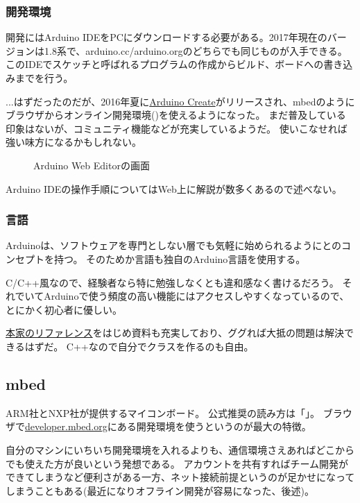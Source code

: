 \documentclass[letterpaper,10pt,dvipdfmx]{sphinxmanual}
\begin{document}
\subsubsection{開発環境}
\label{\detokenize{begginers/microcontroller:id6}}
開発にはArduino
IDEをPCにダウンロードする必要がある。2017年現在のバージョンは1.8系で、arduino.cc/arduino.orgのどちらでも同じものが入手できる。このIDEでスケッチと呼ばれるプログラムの作成からビルド、ボードへの書き込みまでを行う。

...はずだったのだが、2016年夏に\href{https://create.arduino.cc/}{Arduino
Create}がリリースされ、mbedのようにブラウザからオンライン開発環境()を使えるようになった。
まだ普及している印象はないが、コミュニティ機能などが充実しているようだ。
使いこなせれば強い味方になるかもしれない。
\begin{figure}[htbp]
\centering
\capstart

\noindent{}
\caption{Arduino Web Editorの画面}\label{\detokenize{begginers/microcontroller:id12}}\end{figure}

Arduino IDEの操作手順についてはWeb上に解説が数多くあるので述べない。


\subsubsection{言語}
\label{\detokenize{begginers/microcontroller:id7}}
Arduinoは、ソフトウェアを専門としない層でも気軽に始められるようにとのコンセプトを持つ。
そのためか言語も独自のArduino言語を使用する。

C/C++風なので、経験者なら特に勉強しなくとも違和感なく書けるだろう。
それでいてArduinoで使う頻度の高い機能にはアクセスしやすくなっているので、とにかく初心者に優しい。

\href{https://www.arduino.cc/en/Reference/}{本家のリファレンス}をはじめ資料も充実しており、ググれば大抵の問題は解決できるはずだ。
C++なので自分でクラスを作るのも自由。


\subsection{mbed}
\label{\detokenize{begginers/microcontroller:mbed}}
ARM社とNXP社が提供するマイコンボード。
公式推奨の読み方は「」。
ブラウザで\href{https://developer.mbed.org/}{developer.mbed.org}にある開発環境を使うというのが最大の特徴。

自分のマシンにいちいち開発環境を入れるよりも、通信環境さえあればどこからでも使えた方が良いという発想である。
アカウントを共有すればチーム開発ができてしまうなど便利さがある一方、ネット接続前提というのが足かせになってしまうこともある(最近になりオフライン開発が容易になった、後述)。
\end{document}
